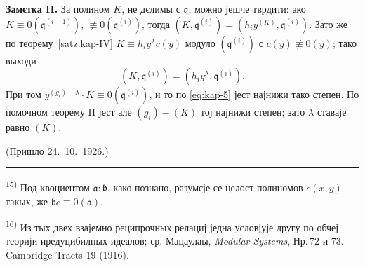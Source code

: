 \documentclass[11pt]{article}
\newcommand{\foreign}[1]{#1}
\theoremstyle{plain}
\begin{document}
\textbf{Замєтка II.} За полином $K$, не дєлимы с $\mathfrak{q}$,
можно јешче тврдити: ако
$K \equiv 0(\mathfrak{q}^{(i+1)})$,
$\not\equiv 0(\mathfrak{q}^{(i)})$, тогда
$(K, \mathfrak{q}^{(i)}) = (h_{i}y^{(K)}, \mathfrak{q}^{(i)})$.
Зато же по теорему~\ref{satz:kap-IV}
$K \equiv h_{i}y^{\lambda}c(y)$ модуло
$(\mathfrak{q}^{(i)})$ с $c(y) \not\equiv 0(y)$; тако выходи
\[
(K, \mathfrak{q}^{(i)}) = (h_{i}y^{\lambda}, \mathfrak{q}^{(i)}).
\]
При том $y^{(g_{i})-\lambda} \cdot K \equiv 0(\mathfrak{q}^{(i)})$,
и то по \eqref{eq:kap-5} јест најнижи тако степен. По помочном
теорему II јест але $(g_{i}) - (K)$ тој најнижи степен; зато
$\lambda$ ставаје равно $(K)$.

\vfill
\begin{flushright}
(Пришло 24.\ 10.\ 1926.)
\end{flushright}

\vspace{0.5em}
\noindent\rule{\textwidth}{0.4pt}
\vspace{0.3em}

{\footnotesize
\textsuperscript{15)} Под квоциентом $\mathfrak{a}:\mathfrak{b}$, како познано,
разумєје се целост полиномов $c(x,y)$ такых, же
$\mathfrak{b}c \equiv 0(\mathfrak{a})$.

\textsuperscript{16)} Из тых двех взајемно реципрочных релациј једна условјује
другу по обчеј теорији иредуцибилных идеалов; ср. Мацаулаы,
\textit{\foreign{Modular Systems}}, Нр.\,72 и 73. \foreign{Cambridge Tracts} 19 (1916).
}
\end{document}
